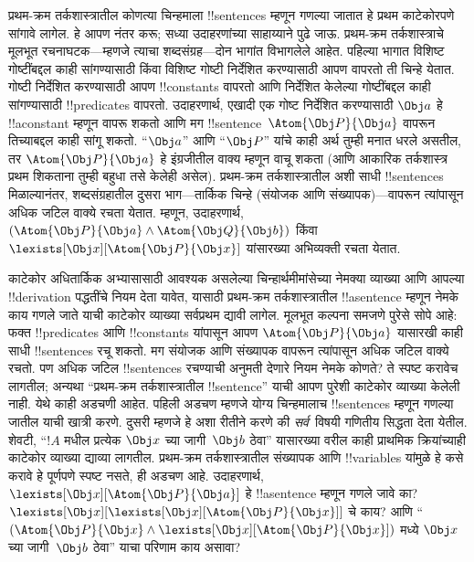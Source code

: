 \documentclass[../../../include/open-logic-section]{subfiles}
\begin{document}


प्रथम-क्रम तर्कशास्त्रातील कोणत्या चिन्हमाला !!{sentence}s म्हणून गणल्या
जातात हे प्रथम काटेकोरपणे सांगावे लागेल. हे आपण नंतर करू; सध्या
उदाहरणांच्या साहाय्याने पुढे जाऊ. प्रथम-क्रम तर्कशास्त्राचे मूलभूत
रचनाघटक---म्हणजे त्याचा शब्दसंग्रह---दोन भागांत विभागलेले आहेत. पहिल्या
भागात विशिष्ट गोष्टींबद्दल काही सांगण्यासाठी किंवा विशिष्ट गोष्टी
निर्देशित करण्यासाठी आपण वापरतो ती चिन्हे येतात. गोष्टी निर्देशित
करण्यासाठी आपण !!{constant}s वापरतो आणि निर्देशित केलेल्या गोष्टींबद्दल
काही सांगण्यासाठी !!{predicate}s वापरतो. उदाहरणार्थ, एखादी एक गोष्ट
निर्देशित करण्यासाठी $\Obj a$ हे !!a{constant} म्हणून वापरू शकतो आणि मग
!!{sentence}~$\Atom{\Obj P}{\Obj a}$ वापरून तिच्याबद्दल काही सांगू शकतो.
``$\Obj a$'' आणि ``$\Obj P$'' यांचे काही अर्थ तुम्ही मनात धरले असतील,
तर $\Atom{\Obj P}{\Obj a}$ हे इंग्रजीतील वाक्य म्हणून वाचू शकता (आणि
आकारिक तर्कशास्त्र प्रथम शिकताना तुम्ही बहुधा तसे केलेही असेल).
प्रथम-क्रम तर्कशास्त्रातील अशी साधी !!{sentence}s मिळाल्यानंतर,
शब्दसंग्रहातील दुसरा भाग---तार्किक चिन्हे (संयोजक आणि संख्यापक)---वापरून
त्यांपासून अधिक जटिल वाक्ये रचता येतात. म्हणून, उदाहरणार्थ,
$(\Atom{\Obj P}{\Obj a} \land \Atom{\Obj Q}{\Obj b})$ किंवा
~$\lexists[\Obj x][\Atom{\Obj P}{\Obj x}]$ यांसारख्या अभिव्यक्ती
रचता येतात.

काटेकोर अधितार्किक अभ्यासासाठी आवश्यक असलेल्या चिन्हार्थमीमांसेच्या
नेमक्या व्याख्या आणि आपल्या !!{derivation} पद्धतींचे नियम देता यावेत,
यासाठी प्रथम-क्रम तर्कशास्त्रातील !!a{sentence} म्हणून नेमके काय गणले
जाते याची काटेकोर व्याख्या सर्वप्रथम द्यावी लागेल. मूलभूत कल्पना समजणे
पुरेसे सोपे आहे: फक्त !!{predicate}s आणि !!{constant}s यांपासून आपण
$\Atom{\Obj P}{\Obj a}$ यासारखी काही साधी !!{sentence}s रचू शकतो. मग
संयोजक आणि संख्यापक वापरून त्यांपासून अधिक जटिल वाक्ये रचतो. पण अधिक
जटिल !!{sentence}s रचण्याची अनुमती देणारे नियम नेमके कोणते? ते स्पष्ट
करावेच लागतील; अन्यथा ``प्रथम-क्रम तर्कशास्त्रातील !!{sentence}'' याची
आपण पुरेशी काटेकोर व्याख्या केलेली नाही. येथे काही अडचणी आहेत. पहिली
अडचण म्हणजे योग्य चिन्हमालाच !!{sentence}s म्हणून गणल्या जातील याची
खात्री करणे. दुसरी म्हणजे हे अशा रीतीने करणे की
\emph{सर्व}~विषयी गणितीय सिद्धता देता येतील. शेवटी,
``$!A$ मधील प्रत्येक $\Obj x$ च्या जागी~$\Obj b$ ठेवा'' यासारख्या
वरील काही प्राथमिक क्रियांच्याही काटेकोर व्याख्या द्याव्या
लागतील. प्रथम-क्रम तर्कशास्त्रातील संख्यापक आणि !!{variable}s यांमुळे हे
कसे करावे हे पूर्णपणे स्पष्ट नसते, ही अडचण आहे. उदाहरणार्थ,
$\lexists[\Obj x][\Atom{\Obj P}{\Obj a}]$ हे !!a{sentence} म्हणून
गणले जावे का? $\lexists[\Obj x][\lexists[\Obj x][\Atom{\Obj P}{\Obj
x}]]$ चे काय? आणि ``$(\Atom{\Obj P}{\Obj x} \land \lexists[\Obj
x][\Atom{\Obj P}{\Obj x}])$ मध्ये $\Obj x$ च्या जागी~$\Obj b$ ठेवा''
याचा परिणाम काय असावा?
\end{document}
